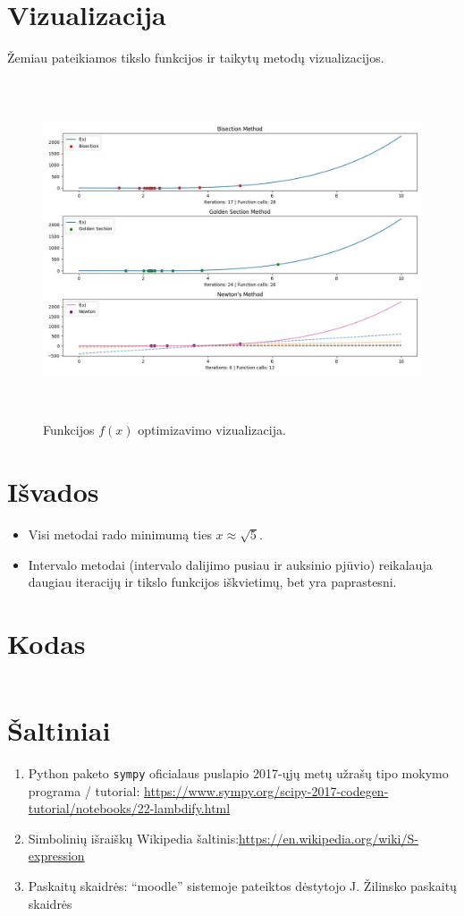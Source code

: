 \documentclass[lithuanian,a4paper,12pt]{article}
\begin{document}
\section{Vizualizacija}
Žemiau pateikiamos tikslo funkcijos ir taikytų metodų vizualizacijos.
\begin{figure}[H]
    \centering
    \includegraphics[width=\textwidth,height=10cm]{figure-1.jpeg}
    \caption{\label{fig:all}Funkcijos $f(x)$ optimizavimo vizualizacija.}
\end{figure}

\section{Išvados}
\begin{itemize}
    \item Visi metodai rado minimumą ties $x \approx \sqrt{5}$.
    \item Intervalo metodai (intervalo dalijimo pusiau ir auksinio pjūvio) reikalauja daugiau iteracijų ir tikslo funkcijos iškvietimų, bet yra paprastesni.
\end{itemize}

\pagebreak
\section{Kodas}
\inputminted{python}{../code/main.py}
\pagebreak

\section{Šaltiniai}
\begin{enumerate}
    \item Python paketo \texttt{sympy} oficialaus puslapio 2017-ųjų metų užrašų tipo mokymo programa / tutorial: \url{https://www.sympy.org/scipy-2017-codegen-tutorial/notebooks/22-lambdify.html}
    \item Simbolinių išraiškų Wikipedia šaltinis:\url{https://en.wikipedia.org/wiki/S-expression}
    \item Paskaitų skaidrės: ``moodle'' sistemoje pateiktos dėstytojo J. Žilinsko paskaitų skaidrės
\end{enumerate}
\end{document}

